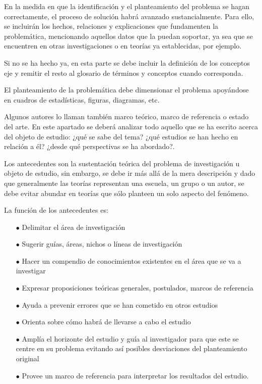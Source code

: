 \documentclass[10pt,a4paper]{protocol}
\begin{document}
En la medida en que la identificación y el planteamiento del problema se hagan correctamente, el proceso de solución habrá avanzado sustancialmente. Para ello, se incluirán los hechos, relaciones y explicaciones que fundamenten la problemática, mencionando aquellos datos que la puedan soportar, ya sea que se encuentren en otras investigaciones o en teorías ya establecidas, por ejemplo. \\ \vspace*{0.5cm}

Si no se ha hecho ya, en esta parte se debe incluir la definición de los conceptos eje y remitir el resto al glosario de términos y conceptos cuando corresponda. \\ \vspace*{0.5cm}

El planteamiento de la problemática debe dimensionar el problema apoyándose en cuadros de estadísticas, figuras, diagramas, etc. \\ \vspace*{0.5cm}

Algunos autores lo llaman también marco teórico, marco de referencia o estado del arte. En este apartado se deberá analizar todo aquello que se ha escrito acerca del objeto de estudio: ¿qué se sabe del tema? ¿qué estudios se han hecho en relación a él? ¿desde qué perspectivas se ha abordado?.\\ \vspace*{0.5cm}

Los antecedentes son la sustentación teórica del problema de investigación u objeto de estudio, sin embargo, se debe ir más allá de la mera descripción y dado que generalmente las teorías representan una escuela, un grupo o un autor, se debe evitar abundar en teorías que sólo planteen un solo aspecto del fenómeno.\\ \vspace*{0.5cm}

La función de los antecedentes es:
\begin{itemize}
	\item[$ \bullet $] Delimitar el área de investigación
	\item[$ \bullet $] Sugerir guías, áreas, nichos o líneas de investigación
	\item[$ \bullet $] Hacer un compendio de conocimientos existentes en el área que se va a investigar
	\item[$ \bullet $] Expresar proposiciones teóricas generales, postulados, marcos de referencia
	\item[$ \bullet $] Ayuda a prevenir errores que se han cometido en otros estudios
	\item[$ \bullet $] Orienta sobre cómo habrá de llevarse a cabo el estudio
	\item[$ \bullet $] Amplía el horizonte del estudio y guía al investigador para que este se centre en su problema evitando así posibles desviaciones del planteamiento original
	\item[$ \bullet $] Provee un marco de referencia para interpretar los resultados del estudio.
\end{itemize}
\end{document}

